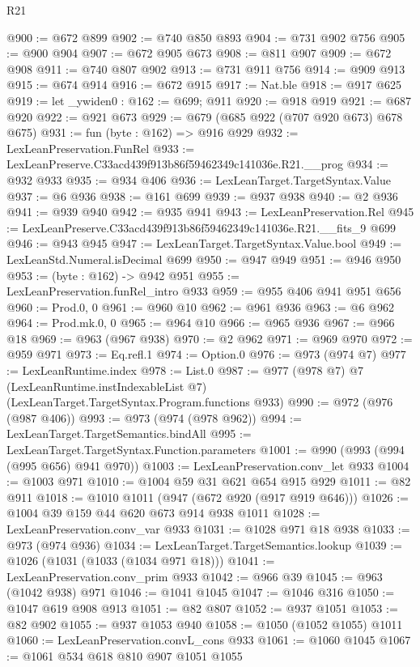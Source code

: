\begin{lexlean}{R21}
\begin{coremodule}
@900 := @672 @899
@902 := @740 @850 @893
@904 := @731 @902 @756
@905 := @900 @904
@907 := @672 @905 @673
@908 := @811 @907
@909 := @672 @908
@911 := @740 @807 @902
@913 := @731 @911 @756
@914 := @909 @913
@915 := @674 @914
@916 := @672 @915
@917 := Nat.ble
@918 := @917 @625
@919 := let _ywiden0 : @162 := @699; @911
@920 := @918 @919
@921 := @687 @920
@922 := @921 @673
@929 := @679 (@685 @922 (@707 @920 @673) @678 @675)
@931 := fun (byte : @162) => @916 @929
@932 := LexLeanPreservation.FunRel
@933 := LexLeanPreserve.C33acd439f913b86f59462349c141036e.R21.__prog
@934 := @932 @933
@935 := @934 @406
@936 := LexLeanTarget.TargetSyntax.Value
@937 := @6 @936
@938 := @161 @699
@939 := @937 @938
@940 := @2 @936
@941 := @939 @940
@942 := @935 @941
@943 := LexLeanPreservation.Rel
@945 := LexLeanPreserve.C33acd439f913b86f59462349c141036e.R21.__fits_9 @699
@946 := @943 @945
@947 := LexLeanTarget.TargetSyntax.Value.bool
@949 := LexLeanStd.Numeral.isDecimal @699
@950 := @947 @949
@951 := @946 @950
@953 := (byte : @162) -> @942 @951
@955 := LexLeanPreservation.funRel_intro @933
@959 := @955 @406 @941 @951 @656
@960 := Prod.{0, 0}
@961 := @960 @10
@962 := @961 @936
@963 := @6 @962
@964 := Prod.mk.{0, 0}
@965 := @964 @10
@966 := @965 @936
@967 := @966 @18
@969 := @963 (@967 @938)
@970 := @2 @962
@971 := @969 @970
@972 := @959 @971
@973 := Eq.refl.{1}
@974 := Option.{0}
@976 := @973 (@974 @7)
@977 := LexLeanRuntime.index
@978 := List.{0}
@987 := @977
    (@978 @7)
    @7
    (LexLeanRuntime.instIndexableList @7)
    (LexLeanTarget.TargetSyntax.Program.functions @933)
@990 := @972 (@976 (@987 @406))
@993 := @973 (@974 (@978 @962))
@994 := LexLeanTarget.TargetSemantics.bindAll
@995 := LexLeanTarget.TargetSyntax.Function.parameters
@1001 := @990 (@993 (@994 (@995 @656) @941 @970))
@1003 := LexLeanPreservation.conv_let @933
@1004 := @1003 @971
@1010 := @1004 @59 @31 @621 @654 @915 @929
@1011 := @82 @911
@1018 := @1010 @1011 (@947 (@672 @920 (@917 @919 @646)))
@1026 := @1004 @39 @159 @44 @620 @673 @914 @938 @1011
@1028 := LexLeanPreservation.conv_var @933
@1031 := @1028 @971 @18 @938
@1033 := @973 (@974 @936)
@1034 := LexLeanTarget.TargetSemantics.lookup
@1039 := @1026 (@1031 (@1033 (@1034 @971 @18)))
@1041 := LexLeanPreservation.conv_prim @933
@1042 := @966 @39
@1045 := @963 (@1042 @938) @971
@1046 := @1041 @1045
@1047 := @1046 @316
@1050 := @1047 @619 @908 @913
@1051 := @82 @807
@1052 := @937 @1051
@1053 := @82 @902
@1055 := @937 @1053 @940
@1058 := @1050 (@1052 @1055) @1011
@1060 := LexLeanPreservation.convL_cons @933
@1061 := @1060 @1045
@1067 := @1061 @534 @618 @810 @907 @1051 @1055

\end{coremodule}
\end{lexlean}
